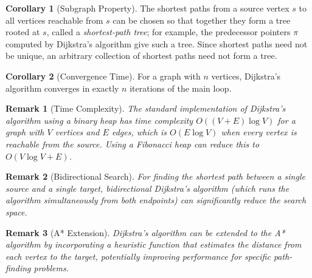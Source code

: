 \documentclass{article}
\newtheorem{remark}{Remark}
\theoremstyle{definition}
\newtheorem{corollary}{Corollary}
\begin{document}
\begin{corollary}[Subgraph Property]
The shortest paths from a source vertex $s$ to all vertices reachable from $s$ can be chosen so that together they form a tree rooted at $s$, called a \textit{shortest-path tree}; for example, the predecessor pointers $\pi$ computed by Dijkstra's algorithm give such a tree. Since shortest paths need not be unique, an arbitrary collection of shortest paths need not form a tree.
\end{corollary}

\begin{corollary}[Convergence Time]
For a graph with $n$ vertices, Dijkstra's algorithm converges in exactly $n$ iterations of the main loop.
\end{corollary}

\begin{remark}[Time Complexity]
The standard implementation of Dijkstra's algorithm using a binary heap has time complexity $O((V + E) \log V)$ for a graph with $V$ vertices and $E$ edges, which is $O(E \log V)$ when every vertex is reachable from the source. Using a Fibonacci heap can reduce this to $O(V \log V + E)$.
\end{remark}

\begin{remark}[Bidirectional Search]
For finding the shortest path between a single source and a single target, bidirectional Dijkstra's algorithm (which runs the algorithm simultaneously from both endpoints) can significantly reduce the search space.
\end{remark}

\begin{remark}[A* Extension]
Dijkstra's algorithm can be extended to the A* algorithm by incorporating a heuristic function that estimates the distance from each vertex to the target, potentially improving performance for specific path-finding problems.
\end{remark}
\end{document}
